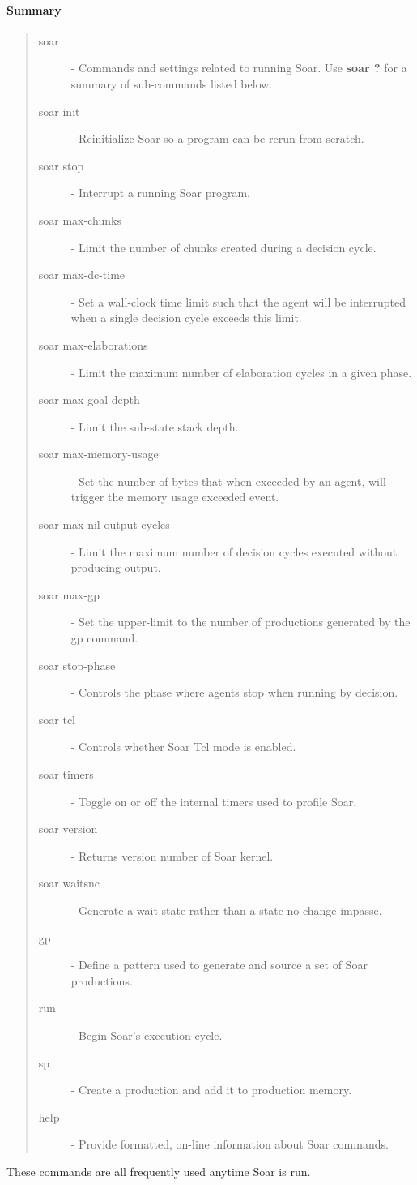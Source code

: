\paragraph{Summary}
\begin{quote}
\begin{description}
\item[soar] - Commands and settings related to running Soar.  Use \textbf{soar ?} for a summary of sub-commands listed below.
\item[soar init] - Reinitialize Soar so a program can be rerun from scratch.
\item[soar stop] - Interrupt a running Soar program.
\item[soar max-chunks] - Limit the number of chunks created during a decision cycle.
\item[soar max-dc-time] - Set a wall-clock time limit such that the agent will be interrupted when a single decision cycle exceeds this limit.
\item[soar max-elaborations] - Limit the maximum number of elaboration cycles in a given phase.
\item[soar max-goal-depth] - Limit the sub-state stack depth.
\item[soar max-memory-usage] - Set the number of bytes that when exceeded by an agent, will trigger the memory usage exceeded event. 
\item[soar max-nil-output-cycles] - Limit the maximum number of decision cycles executed without producing output. 
\item[soar max-gp] - Set the upper-limit to the number of productions generated by the gp command.
\item[soar stop-phase] -  Controls the phase where agents stop when running by decision.
\item[soar tcl] -  Controls whether Soar Tcl mode is enabled.
\item[soar timers] - Toggle on or off the internal timers used to profile Soar.
\item[soar version] - Returns version number of Soar kernel.
\item[soar waitsnc] - Generate a wait state rather than a state-no-change impasse.
\item[gp] - Define a pattern used to generate and source a set of Soar productions.
\item[run] - Begin Soar's execution cycle.
\item[sp] - Create a production and add it to production memory.
\item[help] - Provide formatted, on-line information about Soar commands.
\end{description}
\end{quote}
These commands are all frequently used anytime Soar is run.

